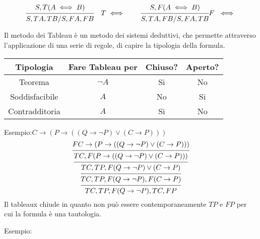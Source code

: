 \begin{equation*}
\begin{prooftree}
\hypo{S,T (A \iff B)}
\infer1 {S,TA,TB/S,FA,FB}
\end{prooftree}
\quad T \iff \qquad
\begin{prooftree}
\hypo{S,F (A \iff B)}
\infer1{S,TA,FB/S,FA,TB}
\end{prooftree}
F \ \iff
\end{equation*}

Il metodo dei Tableau è un metodo dei sistemi deduttivi, che permette attraverso
l'applicazione di una serie di regole, di capire la tipologia della formula.
\begin{tabular}{cccc}
\toprule Tipologia & Fare Tableau per & Chiuso? & Aperto? \\
\midrule
         Teorema & $\neg A$ & Si & No \\
         Soddisfacibile & $A$ & No & Si \\
         Contradditoria & $A$ & Si & No \\
\bottomrule
\end{tabular}

Esempio:$C \rightarrow (P \rightarrow ((Q \rightarrow \neg P) \lor (C \rightarrow P)))$
\begin{equation*}
\begin{prooftree}
\hypo{F C \rightarrow (P \rightarrow ((Q \rightarrow \neg P) \lor (C \rightarrow P)))}
\infer1 {TC,F (P \rightarrow ((Q \rightarrow \neg P) \lor (C \rightarrow P)))}
\infer1 {TC,TP,F (Q \rightarrow \neg P) \lor (C \rightarrow P)}
\infer1 {TC,TP,F (Q \rightarrow \neg P),F (C \rightarrow P)}
\infer1{TC,TP,F (Q \rightarrow \neg P),TC,FP}
\end{prooftree}
\end{equation*}
Il tableaux chiude in quanto non può essere contemporaneamente $TP$ e $FP$ per cui
la formula è una tautologia.

Esempio:

